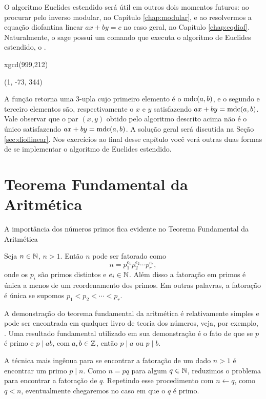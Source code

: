 O algoritmo Euclides estendido será útil em outros dois
momentos futuros: ao procurar pelo inverso modular, no Capítulo 
\ref{chap:modular}, e ao resolvermos a equação diofantina linear
$ax+by = c$ no caso geral, no Capítulo \ref{chap:eqdiof}.
Naturalmente, o sage possui um comando que executa o
algoritmo de Euclides estendido, o . 
\begin{sageinput}
xgcd(999,212)
\end{sageinput}
\begin{sageoutput}
(1, -73, 344)
\end{sageoutput}
A função  retorna uma 3-upla cujo primeiro
elemento é o $\operatorname{mdc}(a,b)$, e o segundo
e terceiro elementos são, respectivamente
o $x$ e $y$ satisfazendo $ax+by = \operatorname{mdc}(a,b)$.
Vale observar que o par $(x,y)$ obtido pelo algoritmo
descrito acima não é o único satisfazendo
$ax + by = \operatorname{mdc}(a,b)$. A solução geral será
discutida na Seção \ref{sec:dioflinear}.
Nos exercícios ao final desse capítulo você verá
outras duas formas de se implementar
o algoritmo de Euclides estendido.


\section{Teorema Fundamental da Aritmética}

A importância dos números primos
fica evidente no Teorema Fundamental
da Aritmética
\begin{theorem}
\label{TFA}
Seja $n \in \mathbb{N}$, $n>1$. Então 
$n$ pode ser fatorado como
$$
  n = p_1^{e_1} p_2^{e_2} \cdots p_r^{e_r},
$$
onde os $p_i$ são primos distintos e 
$e_i \in \mathbb{N}$. Além disso a fatoração
em primos é única a menos de um
reordenamento dos primos. Em outras palavras,
a fatoração é única
se supomos $p_1<p_2 < \cdots < p_r$.
\end{theorem}

A demonstração do teorema fundamental da aritmética
é relativamente simples e pode ser encontrada
em qualquer livro de teoria dos números, veja,
por exemplo, \cite[Sec 1.3]{tnumgugu}. Uma resultado
fundamental utilizado em sua demonstração
é o fato de que se $p$ é primo e $p\mid ab$, com
$a,b \in \mathbb{Z}$, então $p\mid a$ ou $p\mid b$.

A técnica mais ingênua para se encontrar a 
fatoração de um dado $n>1$ é encontrar um primo $p\mid n$.
Como $n = pq$ para algum $q \in \mathbb{N}$, reduzimos
o problema para encontrar a fatoração de $q$. Repetindo
esse procedimento com $n \leftarrow q$, como $q<n$, 
eventualmente chegaremos no caso em que o $q$ é primo.

